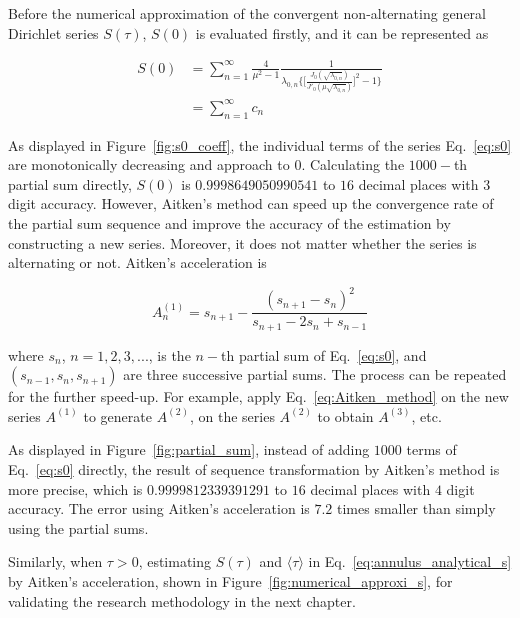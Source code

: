 \newpage

Before the numerical approximation of the convergent non-alternating
general Dirichlet series \cite{hardy2013general} $S(\tau)$, $S(0)$ is
evaluated firstly, and it can be represented as

\begin{equation}\label{eq:s0}
\begin{split}
S(0) &= \sum_{n=1}^{\infty} \frac{4}{\mu^2 - 1} \frac{1}{\lambda_{0,n} \bigg\{\bigg[\frac{J_0(\sqrt{\lambda_{0,n}})}{J'_0(\mu\sqrt{\lambda_{0,n}})}\bigg]^2 -1\bigg\}}\\
&= \sum_{n=1}^{\infty} c_n
\end{split}
\end{equation}

As displayed in Figure~\ref{fig:s0_coeff}, the individual terms of the
series Eq.~\ref{eq:s0} are monotonically decreasing and approach to
$0$. Calculating the $1000-$th partial sum directly, $S(0)$ is
$0.9998649050990541$ to $16$ decimal places with $3$ digit
accuracy. However, Aitken’s method can speed up the convergence rate
of the partial sum sequence and improve the accuracy of the estimation
by constructing a new series. Moreover, it does not matter whether the
series is alternating or not. Aitken's acceleration is

\begin{equation}\label{eq:Aitken_method}
A^{(1)}_n = s_{n+1} - \frac{(s_{n+1} - s_n)^2}{s_{n+1} - 2s_n + s_{n-1}}
\end{equation}

where  $s_n$,  $n=1,  2,  3,  ...$,  is  the  $n-$th  partial  sum  of
Eq.~\ref{eq:s0}, and  $(s_{n-1}, s_n,  s_{n+1})$ are  three successive
partial  sums.   The  process   can  be   repeated  for   the  further
speed-up.  For example,  apply Eq.~\ref{eq:Aitken_method}  on the  new
series $A^{(1)}$  to generate  $A^{(2)}$, on  the series  $A^{(2)}$ to
obtain $A^{(3)}$, etc.

As displayed in Figure~\ref{fig:partial_sum}, instead of adding $1000$
terms of Eq.~\ref{eq:s0} directly, the result of sequence
transformation by Aitken's method is more precise, which is
$0.9999812339391291$ to $16$ decimal places with $4$ digit
accuracy. The error using Aitken's acceleration is $7.2$ times smaller
than simply using the partial sums.


Similarly, when $\tau > 0$, estimating $S(\tau)$ and $\langle \tau \rangle$ in
Eq.~\ref{eq:annulus_analytical_s} by Aitken's acceleration, shown in
Figure~\ref{fig:numerical_approxi_s}, for validating the research
methodology in the next chapter.



